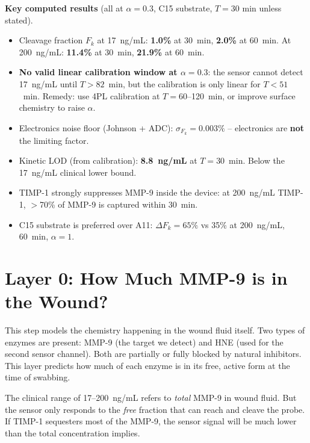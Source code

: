 \documentclass[10pt,a4paper]{article}
\newenvironment{findingbox}{%
  \begin{lrbox}{\tmpbox}\begin{minipage}{0.965\textwidth}\vspace{0.2em}}%
 {\vspace{0.2em}\end{minipage}\end{lrbox}%
  \par\vspace{0.4em}\noindent\colorbox{boxgreen}{\usebox{\tmpbox}}\par\vspace{0.4em}}
\begin{document}
\begin{findingbox}
\textbf{Key computed results} (all at $\alpha = 0.3$, C15 substrate, $T = 30$ min unless stated).
\begin{itemize}[noitemsep, topsep=0pt]
\item Cleavage fraction $F_k$ at 17~ng/mL: \textbf{1.0\%} at 30~min, \textbf{2.0\%} at 60~min.
  At 200~ng/mL: \textbf{11.4\%} at 30~min, \textbf{21.9\%} at 60~min.
\item \textbf{No valid linear calibration window at $\alpha = 0.3$}: the sensor cannot detect
  17~ng/mL until $T > 82$~min, but the calibration is only linear for $T < 51$~min.
  Remedy: use 4PL calibration at $T = 60$--120~min, or improve surface chemistry to raise $\alpha$.
\item Electronics noise floor (Johnson + ADC): $\sigma_{F_k} = 0.003\%$ -- electronics are
  \textbf{not} the limiting factor.
\item Kinetic LOD (from calibration): \textbf{8.8~ng/mL} at $T = 30$~min. Below the 17~ng/mL
  clinical lower bound. \checkmark
\item TIMP-1 strongly suppresses MMP-9 inside the device: at 200~ng/mL TIMP-1,
  $>$70\% of MMP-9 is captured within 30~min.
\item C15 substrate is preferred over A11: $\Delta F_k = 65\%$ vs 35\% at 200~ng/mL,
  60~min, $\alpha = 1$.
\end{itemize}
\end{findingbox}

\section{Layer 0: How Much MMP-9 is in the Wound?}


This step models the chemistry happening in the wound fluid itself. Two types of enzymes
are present: MMP-9 (the target we detect) and HNE (used for the second sensor channel).
Both are partially or fully blocked by natural inhibitors. This layer predicts how much of
each enzyme is in its free, active form at the time of swabbing.


The clinical range of 17--200~ng/mL refers to \textit{total} MMP-9 in wound fluid. But the
sensor only responds to the \textit{free} fraction that can reach and cleave the probe. If
TIMP-1 sequesters most of the MMP-9, the sensor signal will be much lower than the total
concentration implies.
\end{document}
